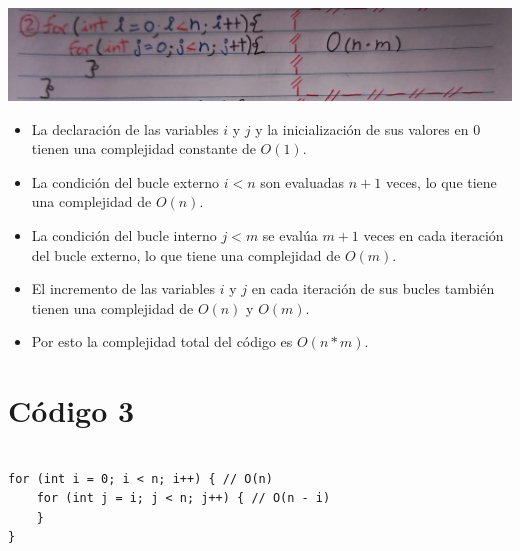 \documentclass[a4paper,onecolumn,10pt]{article}
\begin{document}
\includegraphics[width=1.15\linewidth]{imagenes/punto 2.jpeg}

\begin{itemize}

    \item La declaración de las variables $i$ y $j$ y la inicialización de sus valores en $0$ tienen una complejidad constante de $O(1)$.
    \item La condición del bucle externo $i < n$ son evaluadas $n + 1$ veces, lo que tiene una complejidad de $O(n)$.
    
    \item La condición del bucle interno $j < m$ se evalúa $m + 1$ veces en cada iteración del bucle externo, lo que tiene una complejidad de $O(m)$.
    
    \item El incremento de las variables $i$ y $j$ en cada iteración de sus bucles también tienen una complejidad de $O(n)$ y $O(m)$.
    \item Por esto la complejidad total del código es $O(n * m)$.

\end{itemize}

\section{Código 3}

\begin{verbatim}

for (int i = 0; i < n; i++) { // O(n)
    for (int j = i; j < n; j++) { // O(n - i)
    }
}

\end{verbatim}
\end{document}
